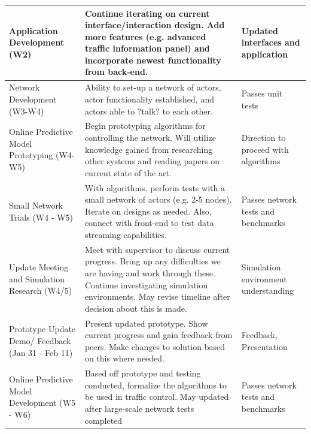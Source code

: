 \documentclass{report}
\begin{document}
\begin{longtable}{|p{4.5cm}|p{6cm}|p{4.5cm}|}
    Application Development (W2)                      & Continue iterating on current interface/interaction design. Add more features (e.g. advanced traffic information panel) and incorporate newest functionality from back-end.                                                        & Updated interfaces and application    \\ \hline
    Network Development (W3-W4)                       & Ability to set-up a network of actors, actor functionality established, and actors able to ?talk? to each other.                                                                                                                   & Passes unit tests                     \\ \hline
    Online Predictive Model Prototyping (W4-W5)       & Begin prototyping algorithms for controlling the network. Will utilize knowledge gained from researching other systems and reading papers on current state of the art.                                                             & Direction to proceed with algorithms  \\ \hline
    Small Network Trials (W4 - W5)                    & With algorithms, perform tests with a small network of actors (e.g. 2-5 nodes). Iterate on designs as needed. Also, connect with front-end to test data streaming capabilities.                                                    & Passes network tests and benchmarks   \\ \hline
    Update Meeting and Simulation Research (W4/5)     & Meet with supervisor to discuss current progress. Bring up any difficulties we are having and work through these. Continue investigating simulation environments. May revise timeline after decision about this is made.           & Simulation environment understanding  \\ \hline
    Prototype Update Demo/ Feedback (Jan 31 - Feb 11) & Present updated prototype. Show current progress and gain feedback from peers. Make changes to solution based on this where needed.                                                                                                & Feedback, Presentation                \\ \hline
    Online Predictive Model Development (W5 - W6)     & Based off prototype and testing conducted, formalize the algorithms to be used in traffic control. May updated after large-scale network tests completed                                                                           & Passes network tests and benchmarks   \\ \hline

\end{longtable}
\end{document}
